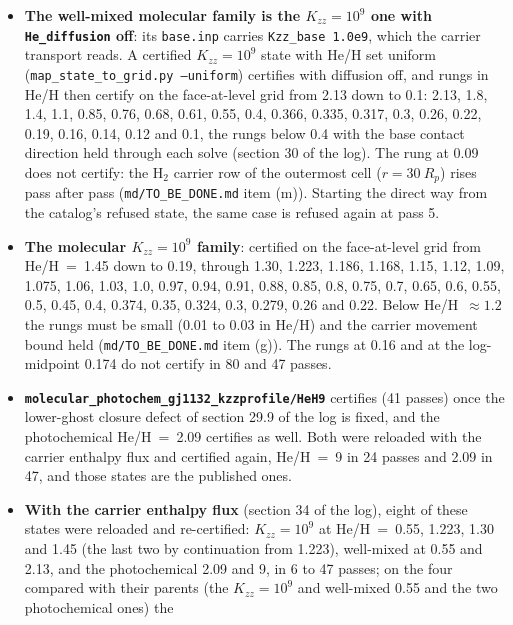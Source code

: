 \documentclass[11pt]{my_memo}
\begin{document}
\begin{itemize}
\item \textbf{The well-mixed molecular family is the $K_{zz}=10^{9}$ one with
      \texttt{He\_diffusion} off}: its \texttt{base.inp} carries
      \texttt{Kzz\_base 1.0e9}, which the carrier transport reads. A certified
      $K_{zz}=10^{9}$ state with He/H set uniform
      (\texttt{map\_state\_to\_grid.py --uniform}) certifies with diffusion
      off, and rungs in He/H then certify on the face-at-level grid from 2.13
      down to 0.1: 2.13, 1.8, 1.4, 1.1, 0.85, 0.76, 0.68, 0.61, 0.55, 0.4,
      0.366, 0.335, 0.317, 0.3, 0.26, 0.22, 0.19, 0.16, 0.14, 0.12 and 0.1,
      the rungs below 0.4 with the base contact direction held through each
      solve (section 30 of the log). The rung at 0.09 does not certify: the
      H$_2$ carrier row of the outermost cell ($r = 30~R_p$) rises pass
      after pass (\texttt{md/TO\_BE\_DONE.md} item (m)). Starting the direct
      way from the catalog's refused state, the same case is refused again
      at pass 5.
\item \textbf{The molecular $K_{zz}=10^{9}$ family}: certified on the
      face-at-level grid from He/H~=~1.45 down to 0.19, through 1.30, 1.223,
      1.186, 1.168, 1.15, 1.12, 1.09, 1.075, 1.06, 1.03, 1.0, 0.97, 0.94,
      0.91, 0.88, 0.85, 0.8, 0.75, 0.7, 0.65, 0.6, 0.55, 0.5, 0.45, 0.4,
      0.374, 0.35, 0.324, 0.3, 0.279, 0.26 and 0.22. Below He/H~$\approx 1.2$
      the rungs must be small (0.01 to 0.03 in He/H) and the carrier movement
      bound held (\texttt{md/TO\_BE\_DONE.md} item (g)). The rungs at 0.16 and
      at the log-midpoint 0.174 do not certify in 80 and 47 passes.
\item \textbf{\texttt{molecular\_photochem\_gj1132\_kzzprofile/HeH9}}
      certifies (41 passes) once the lower-ghost closure defect of section
      29.9 of the log is fixed, and the photochemical He/H~=~2.09 certifies
      as well. Both were reloaded with the carrier enthalpy flux and
      certified again, He/H~=~9 in 24 passes and 2.09 in 47, and those states
      are the published ones.
\item \textbf{With the carrier enthalpy flux} (section 34 of the log), eight
      of these states were reloaded and re-certified: $K_{zz}=10^{9}$ at
      He/H~=~0.55, 1.223, 1.30 and 1.45 (the last two by continuation from
      1.223), well-mixed at 0.55 and 2.13, and the photochemical 2.09 and 9,
      in 6 to 47 passes; on the four compared with their parents (the
      $K_{zz}=10^{9}$ and well-mixed 0.55 and the two photochemical ones) the

\end{itemize}
\end{document}

